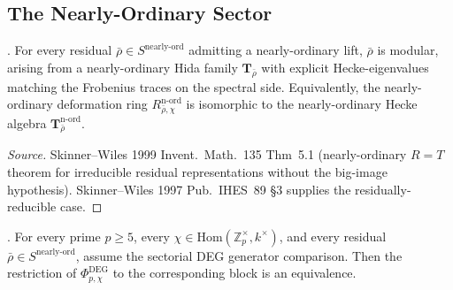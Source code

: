 \subsection{The Nearly-Ordinary Sector}

\begin{lemma}
\label{v4-arith:w6-e:lem:SW-nearly-ord}
\ClaimStatusProvedElsewhere. For every residual
\(\bar\rho\in S^{\mathrm{nearly\text{-}ord}}\) admitting a
nearly-ordinary lift, \(\bar\rho\) is modular, arising from a
nearly-ordinary Hida family \(\mathbf{T}_{\bar\rho}\) with explicit
Hecke-eigenvalues matching the Frobenius traces on the spectral side.
Equivalently, the nearly-ordinary deformation ring
\(R^{\mathrm{n\text{-}ord}}_{\bar\rho,\chi}\) is isomorphic to the
nearly-ordinary Hecke algebra \(\mathbf{T}_{\bar\rho}^{\mathrm{n\text{-}ord}}\).
\end{lemma}

\begin{proof}[Source]
Skinner--Wiles 1999 Invent.~Math.~135 Thm~5.1 (nearly-ordinary
\(R=T\) theorem for irreducible residual representations without the
big-image hypothesis). Skinner--Wiles 1997 Pub.~IHES~89 \S 3 supplies
the residually-reducible case.
\end{proof}

\begin{theorem}
\label{v4-arith:w6-e:thm:TW-removal-nearly-ord}
\ClaimStatusNeedsVerification. For every prime \(p\geq 5\), every
\(\chi\in\mathrm{Hom}(\mathbb{Z}_{p}^{\times},k^{\times})\), and every
residual \(\bar\rho\in S^{\mathrm{nearly\text{-}ord}}\), assume the
sectorial DEG generator comparison. Then the restriction
of \(\Phi^{\mathrm{DEG}}_{p,\chi}\) to the corresponding block is an
equivalence.
\end{theorem}

